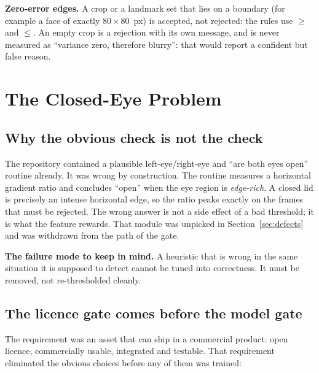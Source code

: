 \documentclass[11pt,a4paper]{article}
\begin{document}
\begin{keybox}
\textbf{Zero-error edges.}   A crop or a landmark set that lies on a boundary (for example a face
  of exactly $80\times 80$~px) is accepted, not rejected: the rules use
  $\ge$ and $\le$. An empty crop is a rejection with its own message, and
  is never measured as ``variance zero, therefore blurry'': that would
  report a confident but false reason.
\end{keybox}
\section{The Closed-Eye Problem}
\label{sec:eyes}

\subsection{Why the obvious check is not the check}

The repository contained a plausible left-eye/right-eye and
``are both eyes open'' routine already. It was wrong by
construction. The routine measures a horizontal
gradient ratio and concludes ``open'' when the eye region is
\emph{edge-rich}. A closed lid is precisely an intense horizontal
edge, so the ratio peaks exactly on the frames that must be rejected.
The wrong answer is not a side effect of a bad threshold; it is what the
feature rewards. That module was unpicked in
Section~\ref{sec:defects} and was withdrawn from the path of the gate.

\begin{warnbox}
\textbf{The failure mode to keep in mind.} A heuristic that is wrong in
the same situation it is supposed to detect cannot be tuned into
correctness. It must be removed, not re-thresholded cleanly.
\end{warnbox}

\subsection{The licence gate comes before the model gate}

The requirement was an asset that can ship in a commercial product:
open licence, commercially usable, integrated and testable. That
requirement eliminated the obvious choices before any of them was
trained:
\end{document}
